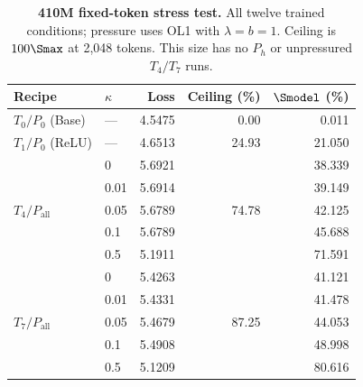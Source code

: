 \begin{table}[H]
\centering\small
\setlength{\tabcolsep}{6pt}
\renewcommand{\arraystretch}{1.05}
\caption{\textbf{410M fixed-token stress test.} All twelve trained conditions; pressure uses OL1 with $\lambda=b=1$. Ceiling is $100\Smax$ at 2,048 tokens. This size has no $P_h$ or unpressured $T_4/T_7$ runs.}
\label{tab:endpoints-410m}
\begin{tabular}{@{}llrrr@{}}
\toprule
Recipe & $\kappa$ & Loss & Ceiling (\%) & $\Smodel$ (\%) \\
\midrule
$T_0/P_{0}$ (Base) & --- & 4.5475 & 0.00 & 0.011 \\
\midrule
$T_1/P_{0}$ (ReLU) & --- & 4.6513 & 24.93 & 21.050 \\
\midrule
\multirow{5}{*}{$T_4/P_{\mathrm{all}}$} & 0 & 5.6921 & \multirow{5}{*}{74.78} & 38.339 \\
 & 0.01 & 5.6914 & & 39.149 \\
 & 0.05 & 5.6789 & & 42.125 \\
 & 0.1 & 5.6789 & & 45.688 \\
 & 0.5 & 5.1911 & & 71.591 \\
\midrule
\multirow{5}{*}{$T_7/P_{\mathrm{all}}$} & 0 & 5.4263 & \multirow{5}{*}{87.25} & 41.121 \\
 & 0.01 & 5.4331 & & 41.478 \\
 & 0.05 & 5.4679 & & 44.053 \\
 & 0.1 & 5.4908 & & 48.998 \\
 & 0.5 & 5.1209 & & 80.616 \\
\bottomrule
\end{tabular}
\end{table}
